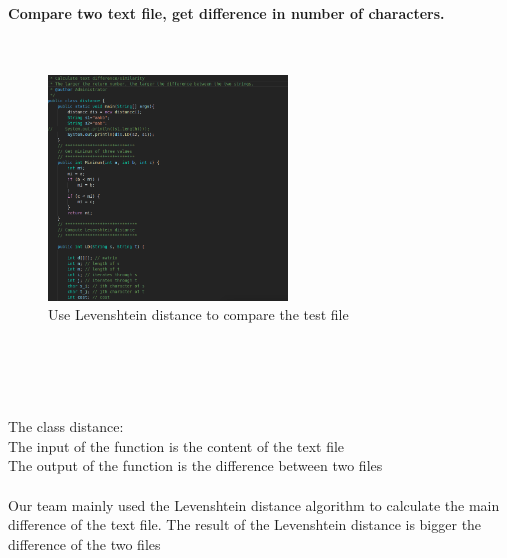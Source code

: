 \documentclass[12pt,a4]{article}
\begin{document}
\paragraph{Compare two text file, get difference in number of characters.}~{}
\newline
\begin{figure}[h]%
		\centering  %
		\includegraphics[width=2.5in]{figure/4221}  	%
		\caption{Use Levenshtein distance to compare the test file}   %
		\end{figure}
\\\\\\\\
The class distance:\\
The input of the function is the content of the text file\\
The output of the function is the difference between two files
\\\\
Our team mainly used the Levenshtein  distance algorithm to calculate the main difference of the text file. The result of the Levenshtein  distance is bigger the difference of the two files
\end{document}
